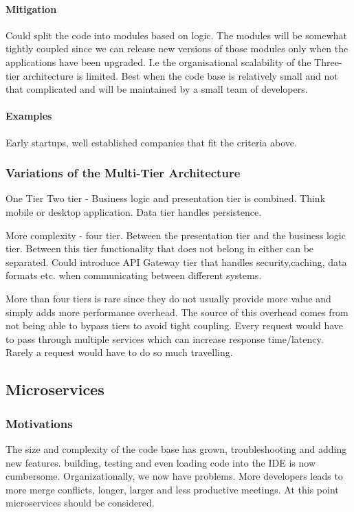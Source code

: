 \paragraph{Mitigation}
Could split the code into modules based on logic.
The modules will be somewhat tightly coupled since we can release new versions of those modules only when the applications have been upgraded.
I.e the organisational scalability of the Three-tier architecture is limited.
Best when the code base is relatively small and not that complicated and will be maintained by a small team of developers.

\paragraph{Examples}
Early startups, well established companies that fit the criteria above.

\subsubsection{Variations of the Multi-Tier Architecture}
One Tier
Two tier - Business logic and presentation tier is combined.
Think mobile or desktop application.
Data tier handles persistence.

More complexity - four tier.
Between the presentation tier and the business logic tier.
Between this tier functionality that does not belong in either can be separated.
Could introduce API Gateway tier that handles security,caching, data formats etc. when communicating between different systems.

More than four tiers is rare since they do not usually provide more value and simply adds more performance overhead.
The source of this overhead comes from not being able to bypass tiers to avoid tight coupling.
Every request would have to pass through multiple services which can increase response time/latency.
Rarely a request would have to do so much travelling.

\subsection{Microservices}

\subsubsection{Motivations}
The size and complexity of the code base has grown, troubleshooting and adding new features.
building, testing and even loading code into the IDE is now cumbersome.
Organizationally, we now have problems.
More developers leads to more merge conflicts, longer, larger and less productive meetings.
At this point microservices should be considered.


